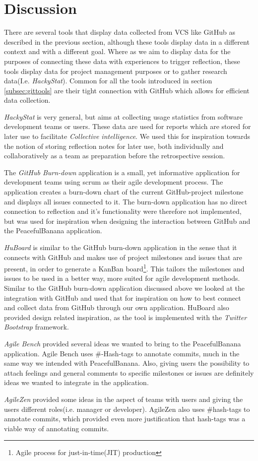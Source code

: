 \section{Discussion}
There are several tools that display data collected from VCS like GitHub as described in the previous section, although these tools display data in a different context and with a different goal. Where as we aim to display data for the purposes of connecting these data with experiences to trigger reflection, these tools display data for project management purposes or to gather research data(I.e. \emph{HackyStat}). Common for all the tools introduced in section \ref{subsec:gittools} are their tight connection with GitHub which allows for efficient data collection.

\emph{HackyStat} is very general, but aims at collecting usage statistics from software development teams or users. These data are used for reports which are stored for later use to facilitate \emph{Collective intelligence}. We used this for inspiration towards the notion of storing reflection notes for later use, both individually and collaboratively as a team as preparation before the retrospective session.   

The \emph{GitHub Burn-down} application is a small, yet informative application for development teams using scrum as their agile development process. The application creates a burn-down chart of the current GitHub-project milestone and displays all issues connected to it. The burn-down application has no direct connection to reflection and it's functionality were therefore not implemented, but was used for inspiration when designing the interaction between GitHub and the PeacefulBanana application. 

\emph{HuBoard} is similar to the GitHub burn-down application in the sense that it connects with GitHub and makes use of project milestones and issues that are present, in order to generate a KanBan board\footnote{Agile process for just-in-time(JIT) production}. This tailors the milestones and issues to be used in a better way, more suited for agile development methods. Similar to the GitHub burn-down application discussed above we looked at the integration with GitHub and used that for inspiration on how to best connect and collect data from GitHub through our own application. 
HuBoard also provided design related inspiration, as the tool is implemented with the \emph{Twitter Bootstrap} framework.

\emph{Agile Bench} provided several ideas we wanted to bring to the PeacefulBanana application. Agile Bench uses \#-Hash-tags to annotate commits, much in the same way we intended with PeacefulBanana. Also, giving users the possibility to attach feelings and general comments to specific milestones or issues are definitely ideas we wanted to integrate in the application.

\emph{AgileZen} provided some ideas in the aspect of teams with users and giving the users different roles(i.e. manager or developer). AgileZen also uses \#hash-tags to annotate commits, which provided even more justification that hash-tags was a viable way of annotating commits.  